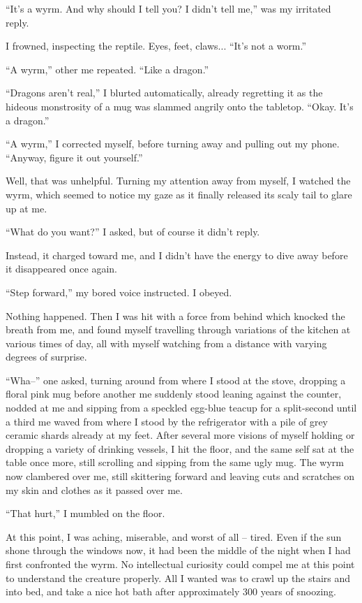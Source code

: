 ``It's a wyrm. And why should I tell you? I didn't tell me,'' was my irritated reply.

I frowned, inspecting the reptile. Eyes, feet, claws... ``It's not a worm.''

``A wyrm,'' other me repeated. ``Like a dragon.''

``Dragons aren't real,'' I blurted automatically, already regretting it as the hideous monstrosity of a mug was slammed angrily onto the tabletop. ``Okay. It's a dragon.''

``A wyrm,'' I corrected myself, before turning away and pulling out my phone. ``Anyway, figure it out yourself.''

Well, that was unhelpful. Turning my attention away from myself, I watched the wyrm, which seemed to notice my gaze as it finally released its scaly tail to glare up at me.

``What do you want?'' I asked, but of course it didn't reply.

Instead, it charged toward me, and I didn't have the energy to dive away before it disappeared once again.

``Step forward,'' my bored voice instructed. I obeyed.

Nothing happened. Then I was hit with a force from behind which knocked the breath from me, and found myself travelling through variations of the kitchen at various times of day, all with myself watching from a distance with varying degrees of surprise.

``Wha–'' one asked, turning around from where I stood at the stove, dropping a floral pink mug before another me suddenly stood leaning against the counter, nodded at me and sipping from a speckled egg-blue teacup for a split-second until a third me waved from where I stood by the refrigerator with a pile of grey ceramic shards already at my feet. After several more visions of myself holding or dropping a variety of drinking vessels, I hit the floor, and the same self sat at the table once more, still scrolling and sipping from the same ugly mug. The wyrm now clambered over me, still skittering forward and leaving cuts and scratches on my skin and clothes as it passed over me.

``That hurt,'' I mumbled on the floor.

At this point, I was aching, miserable, and worst of all – tired. Even if the sun shone through the windows now, it had been the middle of the night when I had first confronted the wyrm. No intellectual curiosity could compel me at this point to understand the creature properly. All I wanted was to crawl up the stairs and into bed, and take a nice hot bath after approximately 300 years of snoozing.

